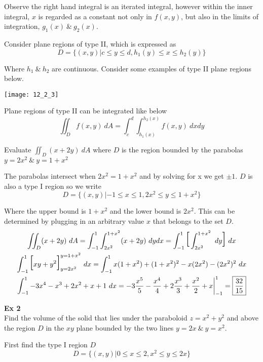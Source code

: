 \documentclass{article}
\begin{document}
  Observe the right hand integral is an iterated integral, however within the inner integral, $ x $ is regarded as a constant not only in $ f(x,y) $, but also in the limits of integration, $ g_1(x) ~\&~ g_2(x) $.

  Consider plane regions of type II, which is expressed as
  \[
    D = \{ (x,y) | c \le y \le d, h_1(y) \le x \le h_2(y) \}
  \]

  Where $ h_1 ~\&~ h_2 $ are continuous. Consider some examples of type II plane regions below.
  \begin{center}
    \texttt{[image: 12\_2\_3]}
  \end{center}
  
  Plane regions of type II can be integrated like below
  \[
    \iint_D f(x,y)~dA = \int^{d}_{c} \int^{h_2(x)}_{h_1(x)} f(x,y) ~dxdy
  \]
 
  Evaluate $ \iint_D (x+2y)~dA $ where $ D $ is the region bounded by the parabolas $ y=2x^{2} ~\&~ y=1+x^{2}$

  The parabolas intersect when $ 2x^{2}=1+x^{2} $ and by solving for x we get $ \pm1 $. $ D $ is also a type I region so we write
  \[
    D = \{ (x,y) | -1 \le x \le 1, 2x^{2} \le y \le 1+x^{2} \}
  \]

  Where the upper bound is $ 1+x^{2} $ and the lower bound is $ 2x^{2} $. This can be determined by plugging in an arbitrary value $ x $ that belongs to the set $ D $.
  \[
    \begin{gathered}
    \iint_D (x+2y)~dA = \int^{1}_{-1} \int^{1+x^{2}}_{2x^{2}} (x+2y) ~dydx = \int^{1}_{-1} \text{\huge{[}} \int^{1+x^{2}}_{2x^{2}} ~dy \text{\huge{]}}~dx\\
    \int^{1}_{-1} \text{\huge{[}} xy+y^{2} \text{\huge{]}}^{y=1+x^{2}}_{y=2x^{2}}~dx =    \int^{1}_{-1} x(1+x^{2})+(1+x^{2})^{2} - x(2x^{2}) - (2x^{2})^{2}~dx\\
  \int^{1}_{-1} -3x^{4}-x^{3}+2x^{2}+x+1~dx = -3\frac{x^{5}}{5}-\frac{x^{4}}{4}+2\frac{x^{3}}{3}+\frac{x^{2}}{2}+x \bigg|^{1}_{-1} = \boxed{\frac{32}{15}}
    \end{gathered}
  \]

  \textbf{Ex 2}\\
  Find the volume of the solid that lies under the paraboloid $ z = x^{2}+y^{2} $ and above the region $ D $ in the $ xy $ plane bounded by the two lines $ y=2x ~\&~ y=x^{2} $.

  First find the type I region $ D $
  \[
    D = \{ (x,y) | 0 \le x \le 2, x^{2} \le y \le 2x \}
  \]
\end{document}
